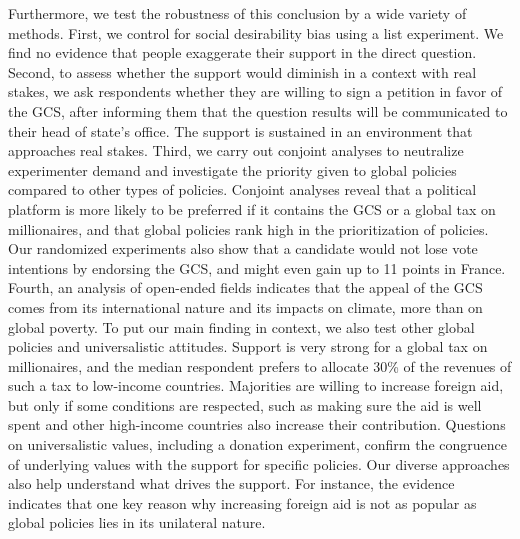\begin{bibunit}
Furthermore, we test the robustness of this conclusion by a wide variety of methods. First, we control for social desirability bias using a list experiment. We find no evidence that people exaggerate their support in the direct question. Second, to assess whether the support would diminish in a context with real stakes, we ask respondents whether they are willing to sign a petition in favor of the GCS, after informing them that the question results will be communicated to their head of state's office. The support is sustained in an environment that approaches real stakes. Third, we carry out conjoint analyses to neutralize experimenter demand and investigate the priority given to global policies compared to other types of policies. Conjoint analyses reveal that a political platform is more likely to be preferred if it contains the GCS or a global tax on millionaires, and that global policies rank high in the prioritization of policies. Our randomized experiments also show that a candidate would not lose vote intentions by endorsing the GCS, and might even gain up to 11 points in France. Fourth, an analysis of open-ended fields indicates that the appeal of the GCS comes from its international nature and its impacts on climate, more than on global poverty. %
To put our main finding in context, we also test other global policies and universalistic attitudes. Support is very strong for a global tax on millionaires, and the median respondent prefers to allocate 30\% of the revenues of such a tax to low-income countries. Majorities are willing to increase foreign aid, but only if some conditions are respected, such as making sure the aid is well spent and other high-income countries also increase their contribution. Questions on universalistic values, including a donation experiment, confirm the congruence of underlying values with the support for specific policies. Our diverse approaches also help understand what drives the support. For instance, the evidence indicates that one key reason why increasing foreign aid is not as popular as global policies lies in its unilateral nature.


\end{bibunit}
